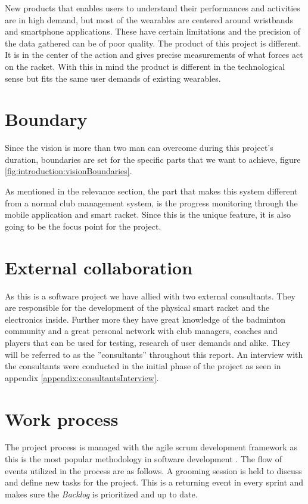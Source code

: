 New products that enables users to understand their performances and activities are in high demand, but most of the wearables are centered around wristbands and smartphone applications.
These have certain limitations and the precision of the data gathered can be of poor quality.
The product of this project is different.
It is in the center of the action and gives precise measurements of what forces act on the racket.
With this in mind the product is different in the technological sense but fits the same user demands of existing wearables.

\section{Boundary}
Since the vision is more than two man can overcome during this project's duration, boundaries are set for the specific parts that we want to achieve, figure \ref{fig:introduction:visionBoundaries}.

As mentioned in the relevance section, the part that makes this system different from a normal club management system, is the progress monitoring through the mobile application and smart racket.
Since this is the unique feature, it is also going to be the focus point for the project.


\section{External collaboration}\label{sec:externalCollaboration}
As this is a software project we have allied with two external consultants.
They are responsible for the development of the physical smart racket and the electronics inside.
Further more they have great knowledge of the badminton community and a great personal network with club managers, coaches and players that can be used for testing, research of user demands and alike.
They will be referred to as the ''consultants'' throughout this report.
An interview with the consultants were conducted in the initial phase of the project as seen in appendix \ref{appendix:consultantsInterview}.

\section{Work process}
The project process is managed with the agile \gls{scrum} development framework as this is the most popular methodology in software development \citep{introduction:work:scrum}. 
The flow of events utilized in the process are as follows.
A grooming session is held to discuss and define new tasks for the project.
This is a returning event in every sprint and makes sure the \textit{Backlog} is prioritized and up to date.


